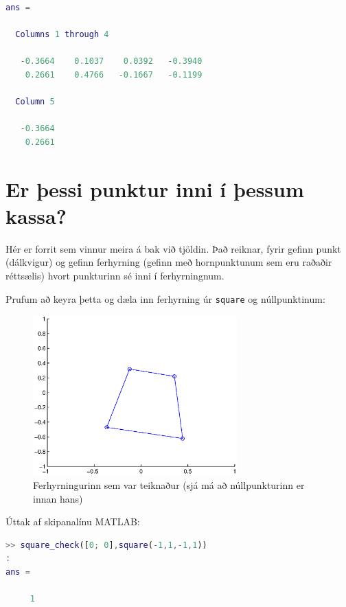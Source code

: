 \documentclass[a4]{article}
\begin{document}
\begin{lstlisting}[language=Matlab]
ans =

  Columns 1 through 4

   -0.3664    0.1037    0.0392   -0.3940
    0.2661    0.4766   -0.1667   -0.1199

  Column 5

   -0.3664
    0.2661
\end{lstlisting}


\section{Er þessi punktur inni í þessum kassa?}

Hér er forrit sem vinnur meira á bak við tjöldin. Það reiknar, fyrir gefinn punkt (dálkvigur) og gefinn ferhyrning (gefinn með hornpunktunum sem eru raðaðir réttsælis) hvort punkturinn sé inni í ferhyrningnum.



Prufum að keyra þetta og dæla inn ferhyrning úr \lstinline{square} og núllpunktinum:

\begin{figure}[h!]
\centering
\includegraphics[width=0.7\textwidth]{sqchdaemi.eps}
\caption{Ferhyrningurinn sem var teiknaður (sjá má að núllpunkturinn er innan hans)}
\end{figure}

Úttak af skipanalínu MATLAB:

\begin{lstlisting}[language=Matlab]
>> square_check([0; 0],square(-1,1,-1,1))
:
ans =

     1
\end{lstlisting}
\end{document}
